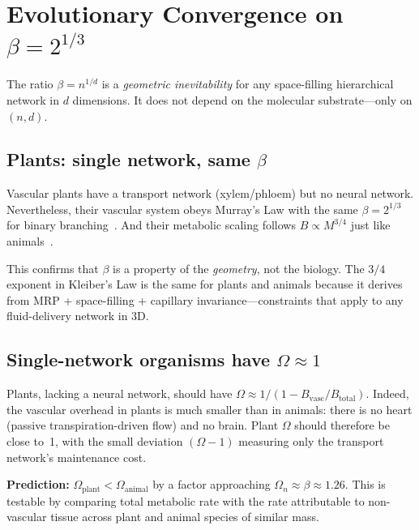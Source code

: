 \documentclass[aps,pre,twocolumn,superscriptaddress,longbibliography]{revtex4-2}
\begin{document}
\section{Evolutionary Convergence on $\beta = 2^{1/3}$}
\label{sec:evolution}

The ratio $\beta = n^{1/d}$ is a \emph{geometric
inevitability} for any space-filling hierarchical network
in $d$ dimensions.
It does not depend on the molecular substrate---only on
$(n, d)$.

\subsection{Plants: single network, same $\beta$}

Vascular plants have a transport network (xylem/phloem)
but no neural network.
Nevertheless, their vascular system obeys Murray's Law
with the same $\beta = 2^{1/3}$ for binary
branching~\cite{McCulloh2003}.
And their metabolic scaling follows $B \propto M^{3/4}$
just like animals~\cite{Niklas1994}.

This confirms that $\beta$ is a property of the
\emph{geometry}, not the biology.
The $3/4$ exponent in Kleiber's Law is the same for
plants and animals because it derives from MRP +
space-filling + capillary invariance---constraints that
apply to any fluid-delivery network in 3D.

\subsection{Single-network organisms have $\Omega \approx 1$}

Plants, lacking a neural network, should have
$\Omega \approx 1/(1 - B_{\text{vasc}}/B_{\text{total}})$.
Indeed, the vascular overhead in plants is much smaller
than in animals: there is no heart (passive
transpiration-driven flow) and no brain.
Plant $\Omega$ should therefore be close to~1,
with the small deviation $(\Omega - 1)$ measuring
only the transport network's maintenance cost.

\textbf{Prediction:}
$\Omega_{\text{plant}} < \Omega_{\text{animal}}$ by a factor
approaching $\Omega_n \approx \beta \approx 1.26$.
This is testable by comparing total metabolic rate with
the rate attributable to non-vascular tissue across
plant and animal species of similar mass.


\end{document}
